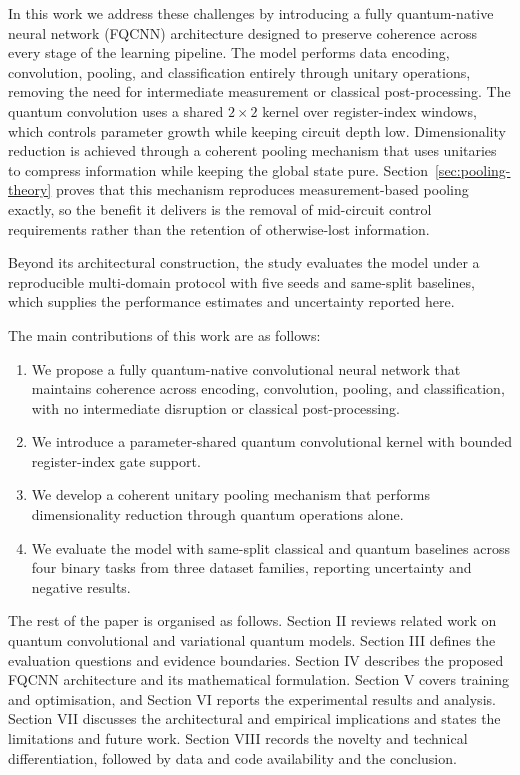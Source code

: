 \documentclass[conference]{IEEEtran}
\begin{document}
In this work we address these challenges by introducing a fully quantum-native neural network (FQCNN) architecture designed to preserve coherence across every stage of the learning pipeline. The model performs data encoding, convolution, pooling, and classification entirely through unitary operations, removing the need for intermediate measurement or classical post-processing. The quantum convolution uses a shared $2\times2$ kernel over register-index windows, which controls parameter growth while keeping circuit depth low. Dimensionality reduction is achieved through a coherent pooling mechanism that uses unitaries to compress information while keeping the global state pure. Section~\ref{sec:pooling-theory} proves that this mechanism reproduces measurement-based pooling exactly, so the benefit it delivers is the removal of mid-circuit control requirements rather than the retention of otherwise-lost information.

Beyond its architectural construction, the study evaluates the model under a reproducible multi-domain protocol with five seeds and same-split baselines, which supplies the performance estimates and uncertainty reported here.

The main contributions of this work are as follows:
\begin{enumerate}
\item We propose a fully quantum-native convolutional neural network that maintains coherence across encoding, convolution, pooling, and classification, with no intermediate disruption or classical post-processing.
\item We introduce a parameter-shared quantum convolutional kernel with bounded register-index gate support.
\item We develop a coherent unitary pooling mechanism that performs dimensionality reduction through quantum operations alone.
\item We evaluate the model with same-split classical and quantum baselines across four binary tasks from three dataset families, reporting uncertainty and negative results.
\end{enumerate}

The rest of the paper is organised as follows. Section II reviews related work
on quantum convolutional and variational quantum models. Section III defines
the evaluation questions and evidence boundaries. Section IV describes the
proposed FQCNN architecture and its mathematical formulation. Section V covers
training and optimisation, and Section VI reports the experimental results and
analysis. Section VII discusses the architectural and empirical implications
and states the limitations and future work. Section VIII records the novelty
and technical differentiation, followed by data and code availability and the
conclusion.
\end{document}
